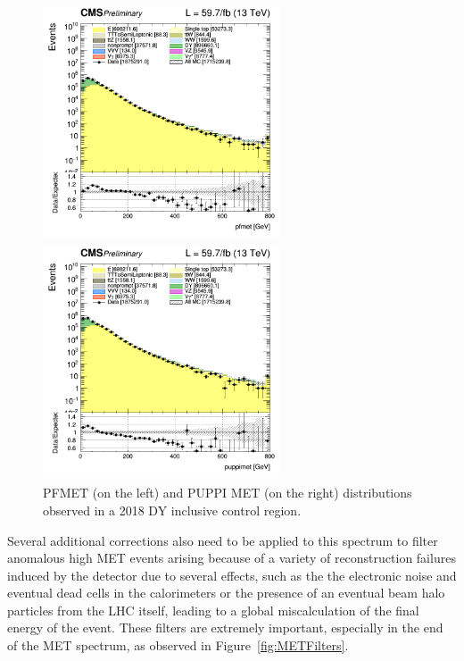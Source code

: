 \documentclass[a4paper, 10pt, openright]{report}
\begin{document}
\begin{figure}[htbp]
\centering
\begin{minipage}[b]{.49\textwidth}
\includegraphics[width=7cm, height=7cm]{figs/log_cratio_inclusiveCR_ll_pfmet_2018.png}
\end{minipage}\hfill
\begin{minipage}[b]{.49\textwidth}
\includegraphics[width=7cm, height=7cm]{figs/log_cratio_inclusiveCR_ll_puppimet_2018.png}
\end{minipage} \hfill
\caption{PFMET (on the left) and \ac{PUPPI} \ac{MET} (on the right) distributions observed in a 2018 \ac{DY} inclusive control region.}
\label{fig:metStudy}
\end{figure}

Several additional corrections also need to be applied to this spectrum to filter anomalous high \ac{MET} events arising because of a variety of reconstruction failures induced by the detector due to several effects, such as the the electronic noise and eventual dead cells in the calorimeters or the presence of an eventual beam halo particles from the \ac{LHC} itself, leading to a global miscalculation of the final energy of the event. These filters are extremely important, especially in the end of the \ac{MET} spectrum, as observed in Figure~\ref{fig:METFilters}.
\end{document}
